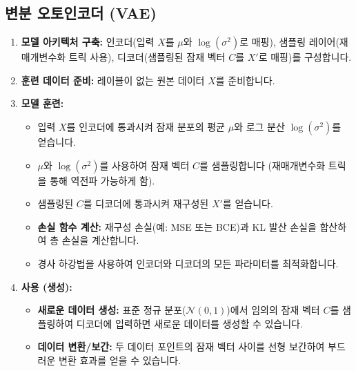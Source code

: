 \documentclass[11pt,a4paper]{article}
\begin{document}
\subsection{변분 오토인코더 (VAE)}
\begin{enumerate}
    \item \textbf{모델 아키텍처 구축:} 인코더(입력 $X$를 $\mu$와 $\log(\sigma^2)$로 매핑), 샘플링 레이어(재매개변수화 트릭 사용), 디코더(샘플링된 잠재 벡터 $C$를 $X'$로 매핑)를 구성합니다.
    \item \textbf{훈련 데이터 준비:} 레이블이 없는 원본 데이터 $X$를 준비합니다.
    \item \textbf{모델 훈련:}
    \begin{itemize}
        \item 입력 $X$를 인코더에 통과시켜 잠재 분포의 평균 $\mu$와 로그 분산 $\log(\sigma^2)$를 얻습니다.
        \item $\mu$와 $\log(\sigma^2)$를 사용하여 잠재 벡터 $C$를 샘플링합니다 (재매개변수화 트릭을 통해 역전파 가능하게 함).
        \item 샘플링된 $C$를 디코더에 통과시켜 재구성된 $X'$를 얻습니다.
        \item \textbf{손실 함수 계산:} 재구성 손실(예: MSE 또는 BCE)과 KL 발산 손실을 합산하여 총 손실을 계산합니다.
        \item 경사 하강법을 사용하여 인코더와 디코더의 모든 파라미터를 최적화합니다.
    \end{itemize}
    \item \textbf{사용 (생성):}
    \begin{itemize}
        \item \textbf{새로운 데이터 생성:} 표준 정규 분포($\mathcal{N}(0, 1)$)에서 임의의 잠재 벡터 $C$를 샘플링하여 디코더에 입력하면 새로운 데이터를 생성할 수 있습니다.
        \item \textbf{데이터 변환/보간:} 두 데이터 포인트의 잠재 벡터 사이를 선형 보간하여 부드러운 변환 효과를 얻을 수 있습니다.
    \end{itemize}
\end{enumerate}
\end{document}

